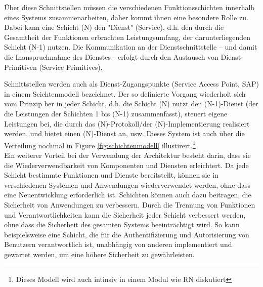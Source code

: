 \documentclass[../vs-script-first-v01.tex]{subfiles}
\begin{document}
Über diese Schnittstellen müssen  die verschiedenen Funktionsschichten innerhalb eines Systems zusammenarbeiten, daher kommt ihnen eine besondere Rolle zu. Dabei kann eine Schicht (N) den "Dienst" (Service), d.h. den durch die Gesamtheit der Funktionen erbrachten Leistungsumfang, der darunterliegenden Schicht (N-1) nutzen.
Die Kommunikation an der Dienstschnittstelle – und damit die Inanspruchnahme des Dienstes - erfolgt durch den Austausch von Dienst-Primitiven (Service Primitives),

Schnittstellen werden auch als Dienst-Zugangspunkte (Service Access Point, SAP) in einem Scichtenmodell bezeichnet.
Der so definierte Vorgang wiederholt sich vom Prinzip her in jeder Schicht, d.h. die Schicht (N) nutzt den (N-1)-Dienst (der die Leistungen der Schichten 1 bis (N-1) zusammenfasst), steuert eigene Leistungen bei, die durch das (N)-Protokoll/der (N)-Implementierung realisiert werden, und bietet einen (N)-Dienst an, usw. Dieses System ist auch über die Verteilung nochmal in Figure \ref{fig:schichtenmodell} illustirert.\footnote{Dieses Modell wird auch intinsiv in einem Modul wie RN diskutiert}
\\
\newline Ein weiterer Vorteil bei der Verwendung der Architektur besteht darin, dass sie die Wiederverwendbarkeit von Komponenten und Diensten erleichtert. Da jede Schicht bestimmte Funktionen und Dienste bereitstellt, können sie in verschiedenen Systemen und Anwendungen wiederverwendet werden, ohne dass eine Neuentwicklung erforderlich ist. 
\newline Schichten können auch dazu beitragen, die Sicherheit von Anwendungen zu verbessern. Durch die Trennung von Funktionen und Verantwortlichkeiten kann die Sicherheit jeder Schicht verbessert werden, ohne dass die Sicherheit des gesamten Systems beeinträchtigt wird. So kann beispielsweise eine Schicht, die für die Authentifizierung und Autorisierung von Benutzern verantwortlich ist, unabhängig von anderen implementiert und gewartet werden, um eine höhere Sicherheit zu gewährleisten.
\end{document}
